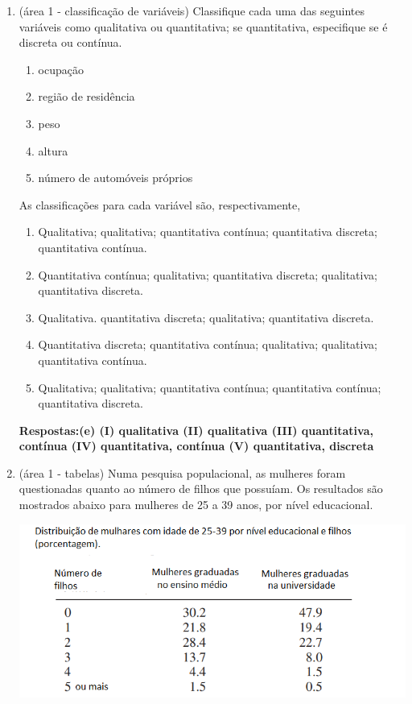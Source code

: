\documentclass[12pt]{article}\documentclass[brazilian,12pt,a4paper,final]{article}
\begin{document}
\begin{enumerate}
\item (área 1 - classificação de variáveis) Classifique cada uma das seguintes variáveis como qualitativa ou quantitativa; se quantitativa, especifique se é discreta ou contínua.
\begin{enumerate}[label=(\Roman*)]
\item ocupação \item região de residência \item peso
\item altura \item número de automóveis próprios
\end{enumerate}

As classificações para cada variável são, respectivamente,
\begin{enumerate}[label=(\alph*)]
\item Qualitativa; qualitativa; quantitativa contínua; quantitativa discreta; quantitativa contínua.
\item Quantitativa contínua; qualitativa; quantitativa discreta; qualitativa; quantitativa discreta.
\item Qualitativa. quantitativa discreta; qualitativa; quantitativa discreta.
\item Quantitativa discreta; quantitativa contínua; qualitativa; qualitativa; quantitativa contínua.
\item Qualitativa; qualitativa; quantitativa contínua; quantitativa contínua; quantitativa discreta.
\end{enumerate}
\textbf{Respostas:(e) (I) qualitativa
(II) qualitativa
(III) quantitativa, contínua
(IV) quantitativa, contínua
(V) quantitativa, discreta}

\item (área 1 - tabelas) Numa pesquisa populacional, as mulheres foram questionadas quanto ao número de filhos que possuíam. Os resultados são mostrados abaixo para mulheres de 25 a 39 anos, por nível educacional.

\includegraphics{Figuras/3D2.png}


\end{enumerate}
\end{document}
